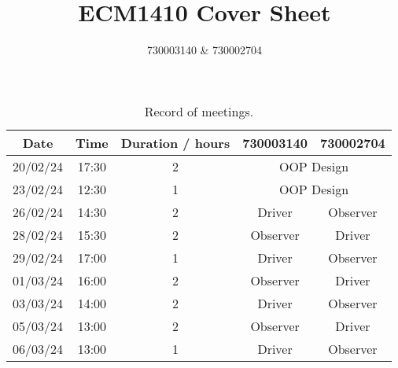 \documentclass{article}
\title{ECM1410 Cover Sheet}
\author{730003140 \& 730002704}
\begin{document}
\maketitle

\begin{table}
    \centering
    \begin{tabular}{ccccc}
        \toprule
        \textbf{Date} & \textbf{Time} & \textbf{Duration / hours} & \textbf{730003140}             & \textbf{730002704} \\
        \midrule
        20/02/24      & 17:30         & 2                         & \multicolumn{2}{c}{OOP Design}                      \\
        23/02/24      & 12:30         & 1                         & \multicolumn{2}{c}{OOP Design}                      \\
        26/02/24      & 14:30         & 2                         & Driver                         & Observer           \\
        28/02/24      & 15:30         & 2                         & Observer                       & Driver             \\
        29/02/24      & 17:00         & 1                         & Driver                         & Observer           \\
        01/03/24      & 16:00         & 2                         & Observer                       & Driver             \\
        03/03/24      & 14:00         & 2                         & Driver                         & Observer           \\
        05/03/24      & 13:00         & 2                         & Observer                       & Driver             \\
        06/03/24      & 13:00         & 1                         & Driver                         & Observer           \\
        \bottomrule
    \end{tabular}
    \caption{Record of meetings.}
\end{table}
\end{document}
